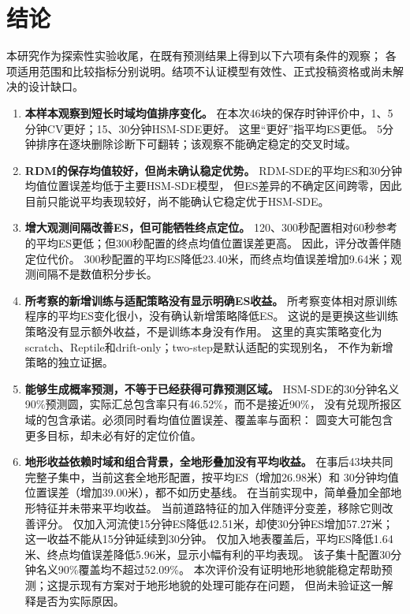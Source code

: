 \section{结论}
本研究作为探索性实验收尾，在既有预测结果上得到以下六项有条件的观察；
各项适用范围和比较指标分别说明。结项不认证模型有效性、正式投稿资格或尚未解决的设计缺口。
\begin{enumerate}
\renewcommand{\labelenumi}{\arabic{enumi}.}
\item \textbf{本样本观察到短长时域均值排序变化。}
在本次46块的保存时钟评价中，1、5分钟CV更好；15、30分钟HSM-SDE更好。
这里“更好”指平均ES更低。
5分钟排序在逐块删除诊断下可翻转；该观察不能确定稳定的交叉时域。

\item \textbf{RDM的保存均值较好，但尚未确认稳定优势。}
RDM-SDE的平均ES和30分钟均值位置误差均低于主要HSM-SDE模型，
但ES差异的不确定区间跨零，因此目前只能说平均表现较好，尚不能确认它稳定优于HSM-SDE。

\item \textbf{增大观测间隔改善ES，但可能牺牲终点定位。}
120、300秒配置相对60秒参考的平均ES更低；但300秒配置的终点均值位置误差更高。
因此，评分改善伴随定位代价。
300秒配置的平均ES降低23.40米，而终点均值误差增加9.64米；观测间隔不是数值积分步长。

\item \textbf{所考察的新增训练与适配策略没有显示明确ES收益。}
所考察变体相对原训练程序的平均ES变化很小，没有确认新增策略降低ES。
这说的是更换这些训练策略没有显示额外收益，不是训练本身没有作用。
这里的真实策略变化为scratch、Reptile和drift-only；two-step是默认适配的实现别名，
不作为新增策略的独立证据。

\item \textbf{能够生成概率预测，不等于已经获得可靠预测区域。}
HSM-SDE的30分钟名义90\%预测圆，实际汇总包含率只有46.52\%，而不是接近90\%，
没有兑现所报区域的包含承诺。必须同时看均值位置误差、覆盖率与面积：
圆变大可能包含更多目标，却未必有好的定位价值。

\item \textbf{地形收益依赖时域和组合背景，全地形叠加没有平均收益。}
在事后43块共同完整子集中，当前这套全地形配置，按平均ES（增加26.98米）和
30分钟均值位置误差（增加39.00米），都不如历史基线。
在当前实现中，简单叠加全部地形特征并未带来平均收益。
当前道路特征的加入伴随评分变差，移除它则改善评分。
仅加入河流使15分钟ES降低42.51米，却使30分钟ES增加57.27米；
这一收益不能从15分钟延续到30分钟。
仅加入地表覆盖后，平均ES降低1.64米、终点均值误差降低5.96米，显示小幅有利的平均表现。
该子集十配置30分钟名义90\%覆盖均不超过52.09\%。
本次评价没有证明地形地貌能稳定帮助预测；这提示现有方案对于地形地貌的处理可能存在问题，
但尚未验证这一解释是否为实际原因。
\end{enumerate}

